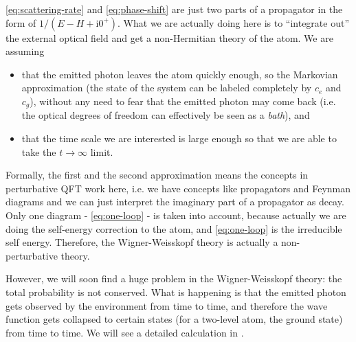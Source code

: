 \documentclass[hyperref, a4paper]{article}
\newcommand*{\ii}{\mathrm{i}}
\begin{document}
\begin{note*}{}
    \eqref{eq:scattering-rate} and \eqref{eq:phase-shift} are just two parts of a propagator in the form of $1 / (E - H + \ii 0^+)$.
    What we are actually doing here is to ``integrate out'' the external optical field and get a non-Hermitian
    theory of the atom. We are assuming 
    \begin{itemize}
        \item that the emitted photon leaves the atom quickly enough, so the Markovian approximation (the state 
        of the system can be labeled completely by $c_e$ and $c_g$), without any need to fear that the emitted 
        photon may come back (i.e. the optical degrees of freedom can effectively be seen as a \emph{bath}), and
        \item that the time scale we are interested is large enough so that we are able to take the $t \to \infty$
        limit.
    \end{itemize} 
    Formally, the first and the second approximation means the concepts in perturbative QFT work here, i.e.
    we have concepts like propagators and Feynman diagrams and we can just interpret the imaginary 
    part of a propagator as decay. Only one diagram - \eqref{eq:one-loop} - is taken into account, because 
    actually we are doing the self-energy correction to the atom, and \eqref{eq:one-loop} is the irreducible
    self energy. Therefore, the Wigner-Weisskopf theory is actually a non-perturbative theory.
\end{note*}

However, we will soon find a huge problem in the Wigner-Weisskopf theory: the total probability is not conserved.
What is happening is that the emitted photon gets observed by the environment from time to time, and therefore 
the wave function gets collapsed to certain states (for a two-level atom, the ground state) from time to time.
We will see a detailed calculation in .
\end{document}
